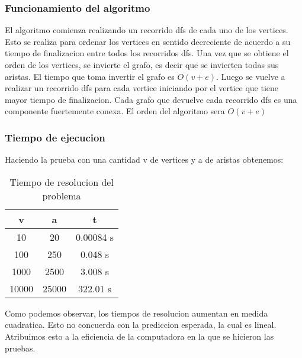 \documentclass{article}
\begin{document}
            \subsubsection{Funcionamiento del algoritmo}
                El algoritmo comienza realizando un recorrido dfs de cada uno de los
                vertices. Esto se realiza para ordenar los vertices en sentido
                decreciente de acuerdo a su tiempo de finalizacion entre todos los
                recorridos dfs. Una vez que se obtiene el orden de los vertices,
                se invierte el grafo, es decir que se invierten todas sus aristas.
                El tiempo que toma invertir el grafo es $O(v+e)$. Luego se vuelve a
                realizar un recorrido dfs para cada vertice iniciando por el vertice
                que tiene mayor tiempo de finalizacion. Cada grafo que devuelve cada
                recorrido dfs es una componente fuertemente conexa.
                El orden del algoritmo sera $O(v+e)$

            \subsubsection{Tiempo de ejecucion}
              Haciendo la prueba con una cantidad v de vertices y a de aristas obtenemos:
                \begin{table}[h!]
                    \centering
                    \caption{Tiempo de resolucion del problema}
                    \begin{tabular}{c|c|c}
                        v & a & t \\
                        \hline
                        10 & 20 & 0.00084 s \\
                        \hline
                        100 & 250 & 0.048 s \\
                        \hline
                        1000 & 2500 & 3.008 s \\
                        \hline
                        10000 & 25000 & 322.01 s
                    \end{tabular}
                \end{table}

                Como podemos observar, los tiempos de resolucion aumentan en medida
                cuadratica. Esto no concuerda con la prediccion esperada, la cual es
                lineal. Atribuimos esto a la eficiencia de la computadora en la que
                se hicieron las pruebas.
\end{document}
